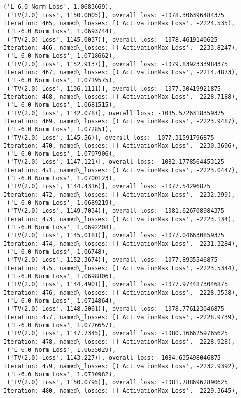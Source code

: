 \documentclass[10pt]{article}
\begin{document}
\begin{Verbatim}[commandchars=\\\{\}]
 ('L-6.0 Norm Loss', 1.0683669),
 ('TV(2.0) Loss', 1150.0005)], overall loss: -1078.306396484375
Iteration: 465, named\_losses: [('ActivationMax Loss', -2224.535),
 ('L-6.0 Norm Loss', 1.0693744),
 ('TV(2.0) Loss', 1145.0037)], overall loss: -1078.4619140625
Iteration: 466, named\_losses: [('ActivationMax Loss', -2233.8247),
 ('L-6.0 Norm Loss', 1.0718662),
 ('TV(2.0) Loss', 1152.9137)], overall loss: -1079.8392333984375
Iteration: 467, named\_losses: [('ActivationMax Loss', -2214.4873),
 ('L-6.0 Norm Loss', 1.0719575),
 ('TV(2.0) Loss', 1136.1111)], overall loss: -1077.30419921875
Iteration: 468, named\_losses: [('ActivationMax Loss', -2228.7188),
 ('L-6.0 Norm Loss', 1.0681515),
 ('TV(2.0) Loss', 1142.078)], overall loss: -1085.5726318359375
Iteration: 469, named\_losses: [('ActivationMax Loss', -2223.9487),
 ('L-6.0 Norm Loss', 1.072851),
 ('TV(2.0) Loss', 1145.56)], overall loss: -1077.31591796875
Iteration: 470, named\_losses: [('ActivationMax Loss', -2230.3696),
 ('L-6.0 Norm Loss', 1.0707906),
 ('TV(2.0) Loss', 1147.121)], overall loss: -1082.1778564453125
Iteration: 471, named\_losses: [('ActivationMax Loss', -2223.0447),
 ('L-6.0 Norm Loss', 1.0700123),
 ('TV(2.0) Loss', 1144.4316)], overall loss: -1077.54296875
Iteration: 472, named\_losses: [('ActivationMax Loss', -2232.399),
 ('L-6.0 Norm Loss', 1.0689219),
 ('TV(2.0) Loss', 1149.7034)], overall loss: -1081.626708984375
Iteration: 473, named\_losses: [('ActivationMax Loss', -2223.134),
 ('L-6.0 Norm Loss', 1.0692208),
 ('TV(2.0) Loss', 1145.0181)], overall loss: -1077.046630859375
Iteration: 474, named\_losses: [('ActivationMax Loss', -2231.3284),
 ('L-6.0 Norm Loss', 1.06748),
 ('TV(2.0) Loss', 1152.3674)], overall loss: -1077.8935546875
Iteration: 475, named\_losses: [('ActivationMax Loss', -2223.5344),
 ('L-6.0 Norm Loss', 1.0698806),
 ('TV(2.0) Loss', 1144.4901)], overall loss: -1077.9744873046875
Iteration: 476, named\_losses: [('ActivationMax Loss', -2228.3538),
 ('L-6.0 Norm Loss', 1.0714864),
 ('TV(2.0) Loss', 1148.5061)], overall loss: -1078.776123046875
Iteration: 477, named\_losses: [('ActivationMax Loss', -2228.9739),
 ('L-6.0 Norm Loss', 1.0726657),
 ('TV(2.0) Loss', 1147.7345)], overall loss: -1080.1666259765625
Iteration: 478, named\_losses: [('ActivationMax Loss', -2228.928),
 ('L-6.0 Norm Loss', 1.0655029),
 ('TV(2.0) Loss', 1143.227)], overall loss: -1084.635498046875
Iteration: 479, named\_losses: [('ActivationMax Loss', -2232.9392),
 ('L-6.0 Norm Loss', 1.0710982),
 ('TV(2.0) Loss', 1150.0795)], overall loss: -1081.7886962890625
Iteration: 480, named\_losses: [('ActivationMax Loss', -2229.3645),

\end{Verbatim}
\end{document}
